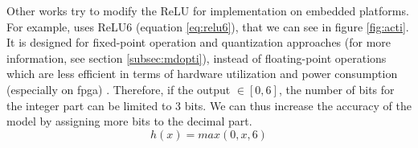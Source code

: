 Other works try to modify the ReLU for implementation on embedded platforms. For example, \cite{howard_mobilenets_2017} uses ReLU6 (equation \ref{eq:relu6}), that we can see in figure \ref{fig:acti}. It is designed for fixed-point operation and quantization approaches (for more information, see section \ref{subsec:mdopti}), instead of floating-point operations which are less efficient in terms of hardware utilization and power consumption (especially on \acrshort{fpga}) \cite{david_hardware_2007}. Therefore, if the output $\in [ 0, 6 ]$, the number of bits for the integer part can be limited to 3 bits. We can thus increase the accuracy of the model by assigning more bits to the decimal part.
%
\begin{equation}
    h(x) = max(0, x, 6)
    \label{eq:relu6}
\end{equation}

